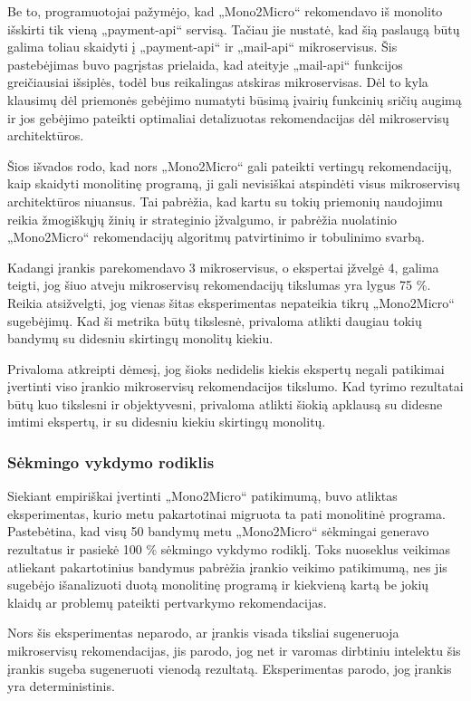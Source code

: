 \documentclass{VUMIFPSbakalaurinis}
\begin{document}
Be to, programuotojai pažymėjo, kad „Mono2Micro“ rekomendavo iš monolito išskirti tik vieną „payment-api“ servisą. Tačiau jie nustatė, kad šią paslaugą būtų galima toliau skaidyti į „payment-api“ ir „mail-api“ mikroservisus. Šis pastebėjimas buvo pagrįstas prielaida, kad ateityje „mail-api“ funkcijos greičiausiai išsiplės, todėl bus reikalingas atskiras mikroservisas. Dėl to kyla klausimų dėl priemonės gebėjimo numatyti būsimą įvairių funkcinių sričių augimą ir jos gebėjimo pateikti optimaliai detalizuotas rekomendacijas dėl mikroservisų architektūros.

Šios išvados rodo, kad nors „Mono2Micro“ gali pateikti vertingų rekomendacijų, kaip skaidyti monolitinę programą, ji gali nevisiškai atspindėti visus mikroservisų architektūros niuansus. Tai pabrėžia, kad kartu su tokių priemonių naudojimu reikia žmogiškųjų žinių ir strateginio įžvalgumo, ir pabrėžia nuolatinio „Mono2Micro“ rekomendacijų algoritmų patvirtinimo ir tobulinimo svarbą.

Kadangi įrankis parekomendavo 3 mikroservisus, o ekspertai įžvelgė 4, galima teigti, jog šiuo atveju mikroservisų rekomendacijų tikslumas yra lygus 75 \%. Reikia atsižvelgti, jog vienas šitas eksperimentas nepateikia tikrų „Mono2Micro“ sugebėjimų. Kad ši metrika būtų tikslesnė, privaloma atlikti daugiau tokių bandymų su didesniu skirtingų monolitų kiekiu.

Privaloma atkreipti dėmesį, jog šioks nedidelis kiekis ekspertų negali patikimai įvertinti viso įrankio mikroservisų rekomendacijos tikslumo. Kad tyrimo rezultatai būtų kuo tikslesni ir objektyvesni, privaloma atlikti šiokią apklausą su didesne imtimi ekspertų, ir su didesniu kiekiu skirtingų monolitų.

\subsubsection{Sėkmingo vykdymo rodiklis}
Siekiant empiriškai įvertinti „Mono2Micro“ patikimumą, buvo atliktas eksperimentas, kurio metu pakartotinai migruota ta pati monolitinė programa. Pastebėtina, kad visų 50 bandymų metu „Mono2Micro“ sėkmingai generavo rezultatus ir pasiekė 100 \% sėkmingo vykdymo rodiklį. Toks nuoseklus veikimas atliekant pakartotinius bandymus pabrėžia įrankio veikimo patikimumą, nes jis sugebėjo išanalizuoti duotą monolitinę programą ir kiekvieną kartą be jokių klaidų ar problemų pateikti pertvarkymo rekomendacijas.

Nors šis eksperimentas neparodo, ar įrankis visada tiksliai sugeneruoja mikroservisų rekomendacijas, jis parodo, jog net ir varomas dirbtiniu intelektu šis įrankis sugeba sugeneruoti vienodą rezultatą. Eksperimentas parodo, jog įrankis yra deterministinis.
\end{document}
